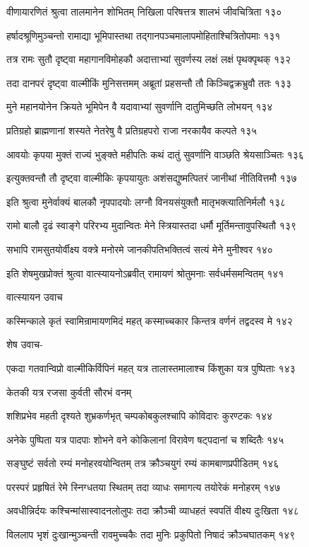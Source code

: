 वीणायारणितं श्रुत्वा तालमानेन शोभितम्
निखिला परिषत्तत्र शालभं जीवचित्रिता १३०

हर्षादश्रूणिमुञ्चन्तो रामाद्या भूमिपास्तथा
तद्गानपञ्चमालापमोहिताश्चित्रितोपमाः १३१

तत्र रामः सुतौ दृष्ट्वा महागानविमोहकौ
अदात्ताभ्यां सुवर्णस्य लक्षं लक्षं पृथक्पृथक् १३२

तदा दानपरं दृष्ट्वा वाल्मीकिं मुनिसत्तमम्
अब्रूतां प्रहसन्तौ तौ किञ्चिद्वक्रभ्रुवौ ततः १३३

मुने महानयोनेन क्रियते भूमिपेन वै
यदावाभ्यां सुवर्णानि दातुमिच्छति लोभयन् १३४

प्रतिग्रहो ब्राह्मणानां शस्यते नेतरेषु वै
प्रतिग्रहपरो राजा नरकायैव कल्पते १३५

आवयोः कृपया मुक्तं राज्यं भुङ्क्ते महीपतिः
कथं दातुं सुवर्णानि वाञ्छति श्रेयसाञ्चितः १३६

इत्युक्तवन्तौ तौ दृष्ट्वा वाल्मीकिः कृपयायुतः
अशंसद्युष्मत्पितरं जानीथां नीतिवित्तमौ १३७

इति श्रुत्वा मुनेर्वाक्यं बालकौ नृपपादयोः
लग्नौ विनयसंयुक्तौ मातृभक्त्यातिनिर्मलौ १३८

रामो बालौ दृढं स्वाङ्गे परिरभ्य मुदान्वितः
मेने स्त्रियास्तदा धर्मौ मूर्तिमन्तावुपस्थितौ १३९

सभापि रामसुतयोर्वीक्ष्य वक्त्रे मनोरमे
जानकीपतिभक्तित्वं सत्यं मेने मुनीश्वर १४०

इति शेषमुखप्रोक्तं श्रुत्वा वात्स्यायनोऽब्रवीत्
रामायणं श्रोतुमनाः सर्वधर्मसमन्वितम् १४१

वात्स्यायन उवाच

कस्मिन्काले कृतं स्वामिन्रामायणमिदं महत्
कस्माच्चकार किन्तत्र वर्णनं तद्वदस्व मे १४२

शेष उवाच-

एकदा गतवान्विप्रो वाल्मीकिर्विपिनं महत्
यत्र तालास्तमालाश्च किंशुका यत्र पुष्पिताः १४३

केतकी यत्र रजसा कुर्वती सौरभं वनम्

शशिप्रभेव महती दृश्यते शुभ्रकर्णभृत्
चम्पकोबकुलश्चापि कोविदारः कुरण्टकः १४४

अनेके पुष्पिता यत्र पादपाः शोभने वने
कोकिलानां विरावेण षट्पदानां च शब्दितैः १४५

सङ्घुष्टं सर्वतो रम्यं मनोहरवयोन्वितम्
तत्र क्रौञ्चयुगं रम्यं कामबाणप्रपीडितम् १४६

परस्परं प्रहृषितं रेमे स्निग्धतया स्थितम्
तदा व्याधः समागत्य तयोरेकं मनोहरम् १४७

अवधीन्निर्दयः कश्चिन्मांसास्वादनलोलुपः
तदा क्रौञ्ची व्याधहतं स्वपतिं वीक्ष्य दुःखिता १४८

विललाप भृशं दुःखान्मुञ्चन्ती रावमुच्चकैः
तदा मुनिः प्रकुपितो निषादं क्रौञ्चघातकम् १४९

